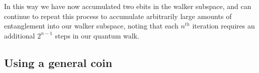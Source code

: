 In this way we have now accumulated two ebits in the walker subspace, and can continue to repeat this process to accumulate arbitrarily large amounts of entanglement into our walker subspace, noting that each $n^{th}$ iteration requires an additional $2^{n-1}$ steps in our quantum walk.

\subsection{Using a general coin}
